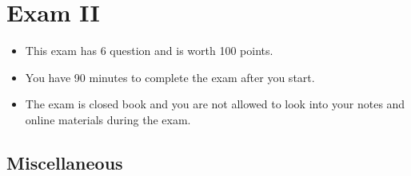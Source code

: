 \chapter{Exam II}
\label{ch:exam2-fillin}

\begin{preamble}
\begin{itemize}
\item This exam has 6 question and is worth 100 points.
\item You have 90 minutes to complete the exam after you start.
\item The exam is closed book and you are not allowed to look into your notes and online materials during the exam.
\end{itemize}
\end{preamble}

\section{Miscellaneous}


